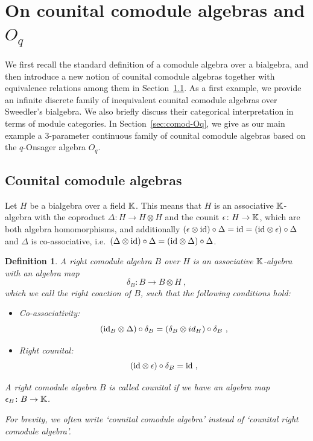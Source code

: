 \documentclass[11pt]{amsart}
\numberwithin{equation}{section}
\newtheorem{defn}[thm]{Definition}
\numberwithin{equation}{section}
\begin{document}
\section{On counital comodule algebras and $O_q$}\label{sec:councom}
We first recall  the standard definition of a comodule algebra over a bialgebra, and then introduce a new notion of counital comodule algebras together with equivalence relations among them in Section~\ref{sec:comod-alg}. As a first example, we provide an infinite discrete family of inequivalent counital comodule algebras over Sweedler's bialgebra. We also briefly discuss their categorical interpretation in terms of module categories. In Section~\ref{sec:comod-Oq}, we give as our main example a 3-parameter continuous family of counital comodule algebras based on the $q$-Onsager algebra $O_q$.

\subsection{Counital comodule algebras}\label{sec:comod-alg}
	Let $H$ be a bialgebra over a field $\mathbb{K}$. This means that $H$ is an associative $\mathbb{K}$-algebra with the coproduct $\Delta\colon H\rightarrow H \otimes H$ and the counit  $\epsilon\colon H \to \mathbb{K}$, which are both  algebra homomorphisms, and additionally $(\epsilon\otimes\mathrm{id}) \circ \Delta = \mathrm{id} =(\mathrm{id} \otimes \epsilon) \circ \Delta$ and $\Delta$ is co-associative, i.e.\ $(\Delta\otimes\mathrm{id}) \circ \Delta = (\mathrm{id} \otimes\Delta) \circ \Delta$. 
	
 \begin{defn} \label{def:right-counit-com}
 A right comodule algebra $B$ over $H$ is an associative $\mathbb{K}$-algebra with an algebra map 
 $$
 \delta_B \colon B \rightarrow B  \otimes H\ ,
 $$
 which we call the right coaction of $B$, such that the following conditions hold:
\begin{itemize}
	\item Co-associativity:
	\begin{equation} \label{coassoc}
	(\mathrm{id}_B \otimes \Delta) \circ \delta_B = (\delta_B \otimes id_H) \circ \delta_B \ ,
	\end{equation}
	\item Right counital:
	\begin{equation} \label{right-counital}
	(\id \otimes \epsilon) \circ \delta_B = \id\ ,
	\end{equation}
\end{itemize}

A right comodule algebra $B$  is called counital if  we have an algebra map  $\epsilon_B \colon B \to \mathbb{K}$. 

For brevity, we often write  `counital comodule algebra' instead of `counital right comodule algebra'.
 \end{defn}
 
\end{document}
